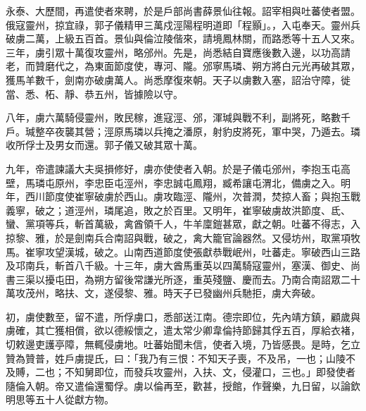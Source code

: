 
\begin{pinyinscope}

 永泰、大歷間，再遣使者來聘，於是戶部尚書薛景仙往報。詔宰相與吐蕃使者盟。俄寇靈州，掠宜祿，郭子儀精甲三萬戍涇陽程明道即「程顥」。，入屯奉天。靈州兵破虜二萬，上級五百首。景仙與倫泣陵偕來，請境鳳林關，而路悉等十五人又來。三年，虜引眾十萬復攻靈州，略邠州。先是，尚悉結自寶應後數入邊，以功高請老，而贊磨代之，為東面節度使，專河、隴。邠寧馬璘、朔方將白元光再破其眾，獲馬羊數千，劍南亦破虜萬人。尚悉摩復來朝。天子以虜數入塞，詔治守障，徙當、悉、柘、靜、恭五州，皆據險以守。



 八年，虜六萬騎侵靈州，敗民稼，進寇涇、邠，渾瑊與戰不利，副將死，略數千戶。瑊整卒夜襲其營；涇原馬璘以兵掩之潘原，射豹皮將死，軍中哭，乃遁去。璘收所俘士及男女而還。郭子儀又破其眾十萬。



 九年，帝遣諫議大夫吳損修好，虜亦使使者入朝。於是子儀屯邠州，李抱玉屯高壁，馬璘屯原州，李忠臣屯涇州，李忠誠屯鳳翔，臧希讓屯渭北，備虜之入。明年，西川節度使崔寧破虜於西山。虜攻臨涇、隴州，次普潤，焚掠人畜；與抱玉戰義寧，破之；道涇州，璘尾追，敗之於百里。又明年，崔寧破虜故洪節度、氐、蠻、黨項等兵，斬首萬級，禽酋領千人，牛羊廩鎧甚眾，獻之朝。吐蕃不得志，入掠黎、雅，於是劍南兵合南詔與戰，破之，禽大籠官論器然。又侵坊州，取黨項牧馬。崔寧攻望漢城，破之。山南西道節度使張獻恭戰岷州，吐蕃走。寧破西山三路及邛南兵，斬首八千級。十三年，虜大酋馬重英以四萬騎寇靈州，塞漢、御史、尚書三渠以擾屯田，為朔方留後常謙光所逐，重英殘鹽、慶而去。乃南合南詔眾二十萬攻茂州，略扶、文，遂侵黎、雅。時天子已發幽州兵馳拒，虜大奔破。



 初，虜使數至，留不遣，所俘虜口，悉部送江南。德宗即位，先內靖方鎮，顧歲與虜確，其亡獲相償，欲以德綏懷之，遣太常少卿韋倫持節歸其俘五百，厚給衣褚，切敕邊吏護亭障，無輒侵虜地。吐蕃始聞未信，使者入境，乃皆感畏。是時，乞立贊為贊普，姓戶虜提氏，曰：「我乃有三恨：不知天子喪，不及吊，一也；山陵不及賻，二也；不知舅即位，而發兵攻靈州，入扶、文，侵灌口，三也。」即發使者隨倫入朝。帝又遣倫還蜀俘。虜以倫再至，歡甚，授館，作聲樂，九日留，以論欽明思等五十人從獻方物。




\end{pinyinscope}
